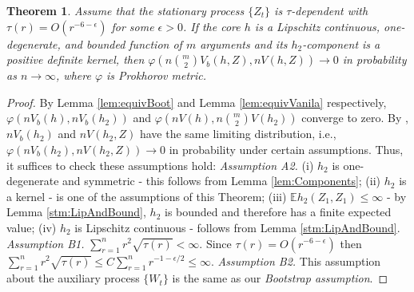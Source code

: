 \documentclass{article}
\newtheorem{Theorem}{Theorem}
\newcommand{\ev}{\mathbb{E}}
\begin{document}
\begin{Theorem}
\label{th:mainOne}
Assume that the stationary process $\{Z_t\}$ is $\tau$-dependent with $\tau(r) = O(r^{-6-\epsilon})$ for some $\epsilon>0$. If the core $h$ is a Lipschitz continuous, one-degenerate, and bounded function of $m$ arguments and its $h_2$-component is a positive definite kernel, then $\varphi(n \binom m 2 V_b(h,Z),n V(h,Z)) \to 0$ in probability as $n\to\infty$, where $\varphi$ is Prokhorov metric. 
\end{Theorem}
\begin{proof}
By  Lemma \ref{lem:equivBoot} and Lemma \ref{lem:equivVanila} respectively, $\varphi(n V_b(h),n V_b(h_2))$ and $\varphi(nV(h),n \binom m 2 V(h_2))$ converge to zero. By \cite[Theorem 3.1]{leucht_dependent_2013}, $n V_b(h_2)$ and $n V(h_2,Z)$ have the same limiting distribution, i.e., $\varphi(n V_b(h_2),n V(h_2,Z)) \to 0$ in probability under certain assumptions. Thus, it suffices to check these assumptions hold:
\textit{Assumption A2.}
(i) $h_2$ is one-degenerate and symmetric - this follows from Lemma  \ref{lem:Components}; 
(ii) $h_2$ is a kernel - is one of the assumptions of this Theorem;
(iii) $\ev h_2(Z_1,Z_1) \leq \infty$ - by Lemma \ref{stm:LipAndBound}, $h_2$ is bounded and therefore has a finite expected value;
(iv) $h_2$ is Lipschitz continuous - follows from Lemma \ref{stm:LipAndBound}.
\textit{Assumption B1.} $\sum_{r=1}^n r^2 \sqrt{\tau(r)} < \infty$. Since $\tau(r) = O(r^{-6-\epsilon})$ then $\sum_{r=1}^n r^2 \sqrt{\tau(r)} \leq C \sum_{r=1}^n r^{-1 - \epsilon/2} \leq \infty$.
\textit{Assumption B2.} This assumption about the auxiliary process $\{W_t\}$ is the same as our \textit{Bootstrap assumption}. 
\end{proof}  
\end{document}
